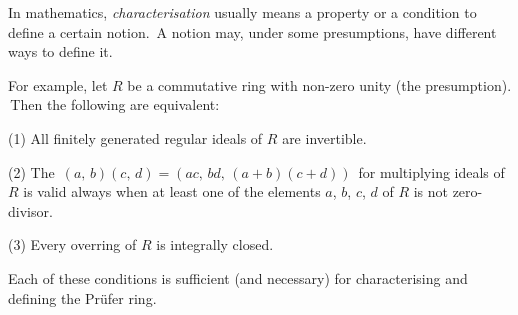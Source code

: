 \documentclass[12pt]{article}
\begin{document}
In mathematics, {\em characterisation} usually means a property or a condition to define a certain notion. \,A notion may, under some presumptions, have different  ways to define it.

For example, let $R$ be a commutative ring with non-zero unity (the presumption). \,Then the following are equivalent:

(1) All finitely generated regular ideals of $R$ are invertible.

(2) The  \,$(a,\,b)(c,\,d) = (ac,\,bd,\,(a+b)(c+d))$\, for multiplying ideals of $R$ is valid always when at least one of the elements $a$, $b$, $c$, $d$ of $R$ is not zero-divisor.

(3) Every overring of $R$ is integrally closed.

Each of these conditions is sufficient (and necessary) for characterising and defining the Pr\"ufer ring.
\end{document}
